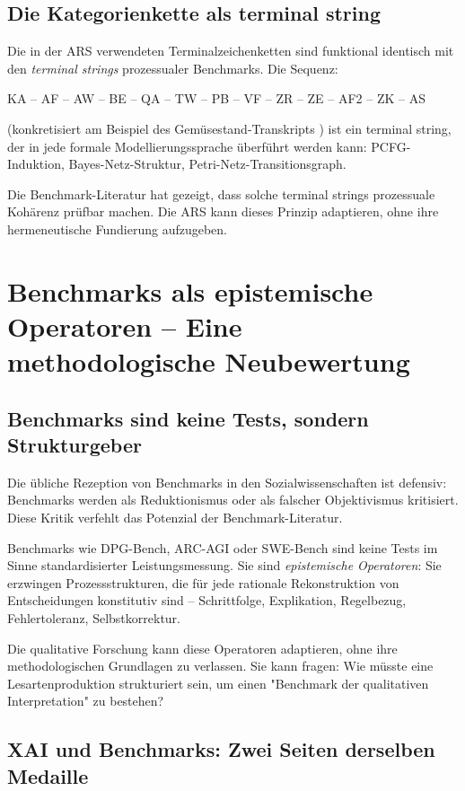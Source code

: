 \documentclass[12pt,a4paper]{article}
\begin{document}
\subsection{Die Kategorienkette als terminal string}

Die in der ARS verwendeten Terminalzeichenketten sind funktional identisch mit den \textit{terminal strings} prozessualer Benchmarks. Die Sequenz:

KA – AF – AW – BE – QA – TW – PB – VF – ZR – ZE – AF2 – ZK – AS

(konkretisiert am Beispiel des Gemüsestand-Transkripts \cite{koop2024cfti}) ist ein terminal string, der in jede formale Modellierungssprache überführt werden kann: PCFG-Induktion, Bayes-Netz-Struktur, Petri-Netz-Transitionsgraph.

Die Benchmark-Literatur hat gezeigt, dass solche terminal strings prozessuale Kohärenz prüfbar machen. Die ARS kann dieses Prinzip adaptieren, ohne ihre hermeneutische Fundierung aufzugeben.

\section{Benchmarks als epistemische Operatoren – Eine methodologische Neubewertung}

\subsection{Benchmarks sind keine Tests, sondern Strukturgeber}

Die übliche Rezeption von Benchmarks in den Sozialwissenschaften ist defensiv: Benchmarks werden als Reduktionismus oder als falscher Objektivismus kritisiert. Diese Kritik verfehlt das Potenzial der Benchmark-Literatur.

Benchmarks wie DPG-Bench, ARC-AGI oder SWE-Bench sind keine Tests im Sinne standardisierter Leistungsmessung. Sie sind \textit{epistemische Operatoren}: Sie erzwingen Prozessstrukturen, die für jede rationale Rekonstruktion von Entscheidungen konstitutiv sind – Schrittfolge, Explikation, Regelbezug, Fehlertoleranz, Selbstkorrektur.

Die qualitative Forschung kann diese Operatoren adaptieren, ohne ihre methodologischen Grundlagen zu verlassen. Sie kann fragen: Wie müsste eine Lesartenproduktion strukturiert sein, um einen "Benchmark der qualitativen Interpretation" zu bestehen?

\subsection{XAI und Benchmarks: Zwei Seiten derselben Medaille}
\end{document}
